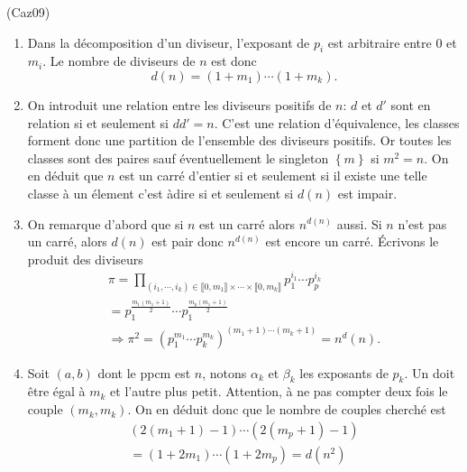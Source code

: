 \begin{tiny}(Caz09)\end{tiny}
\begin{enumerate}
  \item Dans la décomposition d'un diviseur, l'exposant de $p_i$ est arbitraire entre $0$ et $m_i$. Le nombre de diviseurs de $n$ est donc
\begin{displaymath}
 d(n)=(1+m_1)\cdots(1+m_k).
\end{displaymath}
  \item On introduit une relation entre les diviseurs positifs de $n$: $d$ et $d'$ sont en relation si et seulement si $dd'=n$. C'est une relation d'équivalence, les classes forment donc une partition de l'ensemble des diviseurs positifs. Or toutes les classes sont des paires sauf éventuellement le singleton $\left\lbrace m \right\rbrace $ si $m^2 = n$.\newline
  On en déduit que $n$ est un carré d'entier si et seulement si il existe une telle classe à un élement c'est àdire si et seulement si $d(n)$ est impair. 
  \item On remarque d'abord que si $n$ est un carré alors $n^{d(n)}$ aussi. Si $n$ n'est pas un carré, alors $d(n)$ est pair donc $n^{d(n)}$ est encore un carré.\newline
  \'Ecrivons le produit des diviseurs
  \begin{multline*}
   \pi = \prod_{(i_1,\cdots,i_k)\in \llbracket 0,m_1\rrbracket \times \cdots \times \llbracket 0,m_k\rrbracket} p_1^{i_1} \cdots p_p^{i_k}\\
   = p_1^{\frac{m_1(m_1+1)}{2}}\cdots p_1^{\frac{m_p(m_1+1)}{2}}\\
   \Rightarrow \pi^2 = \left(p_1^{m_1}\cdots p_k^{m_k}\right)^{(m_1+1)\cdots(m_k+1)} = n^d(n). 
   \end{multline*}

  \item Soit $(a,b)$ dont le ppcm est $n$, notons $\alpha_k$ et $\beta_k$ les exposants de $p_k$. Un doit être égal à $m_k$ et l'autre plus petit. Attention, à ne pas compter deux fois le couple $(m_k,m_k)$. On en déduit donc que le nombre de couples cherché est
\begin{multline*}
 (2(m_1+1)-1)\cdots (2(m_p+1)-1)\\=(1+2m_1)\cdots(1+2m_p)=d(n^2)
\end{multline*}
\end{enumerate}  